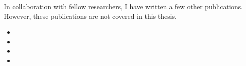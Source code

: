 \begin{refsection}
In collaboration with fellow researchers, I have written a few other publications.
However, these publications are not covered in this thesis.

\begin{itemize}
  \item {}
  \item {}
  \item {}
  \item {}
\end{itemize}


\end{refsection}

